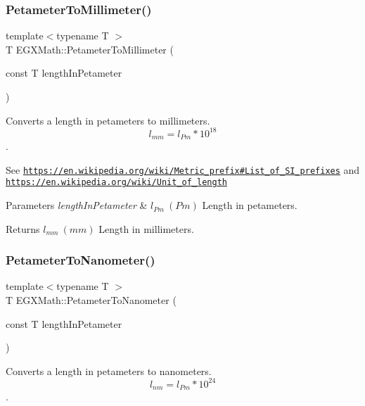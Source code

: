 \subsubsection{\texorpdfstring{Petameter\+To\+Millimeter()}{PetameterToMillimeter()}}
{\footnotesize\ttfamily template$<$typename T $>$ \\
T E\+G\+X\+Math\+::\+Petameter\+To\+Millimeter (\begin{DoxyParamCaption}\item[{const T}]{length\+In\+Petameter }\end{DoxyParamCaption})}



Converts a length in petameters to millimeters. \[ l_{mm}=l_{Pm} * 10^{18} \]. 

See \href{https://en.wikipedia.org/wiki/Metric_prefix#List_of_SI_prefixes}{\tt https\+://en.\+wikipedia.\+org/wiki/\+Metric\+\_\+prefix\#\+List\+\_\+of\+\_\+\+S\+I\+\_\+prefixes} and \href{https://en.wikipedia.org/wiki/Unit_of_length}{\tt https\+://en.\+wikipedia.\+org/wiki/\+Unit\+\_\+of\+\_\+length} 
\begin{DoxyParams}{Parameters}
{\em length\+In\+Petameter} & $ l_{Pm}\ (Pm)$ Length in petameters. \\
\hline
\end{DoxyParams}
\begin{DoxyReturn}{Returns}
$ l_{mm}\ (mm)$ Length in millimeters. 
\end{DoxyReturn}
\mbox{\label{group___e_g_x_math-_conversions-_length_conversions-_petameter-_s_i_ga34b9bf3c48321cabdc394ab86a2e7cd7}} 
\subsubsection{\texorpdfstring{Petameter\+To\+Nanometer()}{PetameterToNanometer()}}
{\footnotesize\ttfamily template$<$typename T $>$ \\
T E\+G\+X\+Math\+::\+Petameter\+To\+Nanometer (\begin{DoxyParamCaption}\item[{const T}]{length\+In\+Petameter }\end{DoxyParamCaption})}



Converts a length in petameters to nanometers. \[ l_{nm}=l_{Pm} * 10^{24} \]. 

